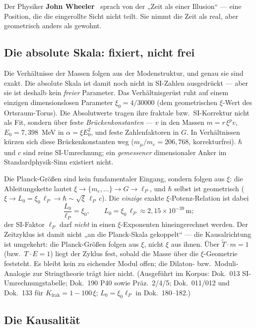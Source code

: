 \documentclass[11pt,a4paper]{article}
\begin{document}
Der Physiker \textbf{John Wheeler}~\cite{Wheeler1968} sprach von der „Zeit als einer Illusion`` --- eine Position, die die eingerollte Sicht nicht teilt. Sie nimmt die Zeit als real, aber geometrisch anders als gewohnt.

\subsection{Die absolute Skala: fixiert, nicht frei}

Die Verhältnisse der Massen folgen aus der Modenstruktur, und genau sie sind exakt. Die absolute Skala ist damit noch nicht in SI-Zahlen ausgedrückt --- aber sie ist deshalb kein \emph{freier} Parameter. Das Verhältnisgerüst ruht auf einem einzigen dimensionslosen Parameter $\xi_0 = 4/30000$ (dem geometrischen $\xi$-Wert des Ortsraum-Torus). Die Absolutwerte tragen ihre fraktale bzw.\ SI-Korrektur nicht als Fit, sondern über feste \emph{Brückenkonstanten} --- $v$ in den Massen $m = r\,\xi^{p} v$, $E_0 = 7{,}398$~MeV in $\alpha = \xi E_0^2$, und feste Zahlenfaktoren in $G$. In Verhältnissen kürzen sich diese Brückenkonstanten weg ($m_\mu/m_e = 206{,}768$, korrekturfrei). $\hbar$ und $c$ sind reine SI-Umrechnung; ein \emph{gemessener} dimensionaler Anker im Standardphysik-Sinn existiert nicht.

Die Planck-Größen sind kein fundamentaler Eingang, sondern folgen aus $\xi$: die Ableitungskette lautet $\xi \to \{m_e,\dots\} \to G \to \ell_P$, und $\hbar$ selbst ist geometrisch ($\xi \to L_0 = \xi_0\,\ell_P \to \hbar \sim \sqrt{\xi}\,\ell_P\,c$). Die \emph{einzige} exakte $\xi$-Potenz-Relation ist dabei
\[
  \frac{L_0}{\ell_P} = \xi_0, \qquad L_0 = \xi_0\,\ell_P \approx 2{,}15\times10^{-39}\,\text{m};
\]
der SI-Faktor $\ell_P$ darf \emph{nicht} in einen $\xi$-Exponenten hineingerechnet werden. Der Zeitzyklus ist damit nicht „an die Planck-Skala gekoppelt`` --- die Kausalrichtung ist umgekehrt: die Planck-Größen folgen aus $\xi$, nicht $\xi$ aus ihnen. Über $\tilde{T}\cdot m = 1$ (bzw.\ $T\cdot E = 1$) liegt der Zyklus fest, sobald die Masse über die $\xi$-Geometrie feststeht. Es bleibt kein zu eichender Modul offen; die Dilaton- bzw.\ Moduli-Analogie zur Stringtheorie trägt hier nicht. (Ausgeführt im Korpus: Dok.~013 SI-Umrechnungstabelle; Dok.~190 P40 sowie Präz.~2/4/5; Dok.~011/012 und Dok.~133 für $K_\text{frak}=1-100\,\xi$; $L_0=\xi_0\ell_P$ in Dok.~180--182.)

\subsection{Die Kausalität}
\end{document}
